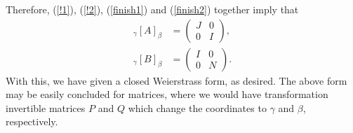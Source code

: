 Therefore, (\ref{!1}),  (\ref{!2}),  (\ref{finish1}) and  (\ref{finish2}) together imply that 
\begin{equation*}
\begin{aligned}
{}_{\gamma}[A]_{\beta}
&=
\begin{pmatrix}
J & 0\\
0 & I
\end{pmatrix},
\\[1em]
{}_{\gamma}[B]_{\beta}
&=
\begin{pmatrix}
I & 0\\
0 & N
\end{pmatrix}.
\end{aligned}
\end{equation*}
With this, we have given a closed Weierstrass form, as desired. The above form may be easily concluded for matrices, where we would have transformation invertible matrices $P$ and $Q$ which change the coordinates to $\gamma$ and $\beta$, respectively.









